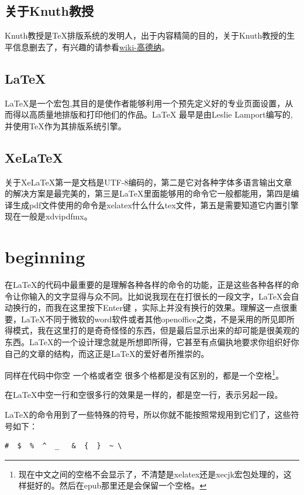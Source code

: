 \documentclass[11pt,oneside]{book}
\begin{document}
\section{关于Knuth教授}
Knuth教授是\TeX 排版系统的发明人，出于内容精简的目的，关于Knuth教授的生平信息删去了，有兴趣的请参看\href{http://zh.wikipedia.org/wiki/%E9%AB%98%E5%BE%B7%E7%BA%B3}{wiki-高德纳}。

\section{LaTeX}
LaTeX是一个宏包,其目的是使作者能够利用一个预先定义好的专业页面设置，从而得以高质量地排版和打印他们的作品。LaTeX 最早是由Leslie Lamport编写的,并使用\TeX 作为其排版系统引擎\cite{lshort}。

\section{XeLaTeX}
关于XeLaTeX第一是文档是UTF-8编码的，第二是它对各种字体多语言输出文章的解决方案是最完美的，第三是LaTeX里面能够用的命令它一般都能用，第四是编译生成pdf文件使用的命令是xelatex什么什么tex文件，第五是需要知道它内置引擎现在一般是xdvipdfmx。


\chapter{beginning}
在\LaTeX 的代码中最重要的是理解各种各样的命令的功能，正是这些各种各样的命令让你输入的文字显得与众不同。比如说我现在在打很长的一段文字，\LaTeX 会自动换行的，而我在这里按下Enter键
，实际上并没有换行的效果。理解这一点很重要，\LaTeX 不同于微软的word软件或者其他openoffice之类，不是采用的所见即所得模式，我在这里打的是奇奇怪怪的东西，但是最后显示出来的却可能是很美观的东西。\LaTeX 的一个设计理念就是所想即所得，它甚至有点偏执地要求你组织好你自己的文章的结构，而这正是\LaTeX 的爱好者所推崇的。

同样在代码中你空 一个格或者空      很多个格都是没有区别的，都是一个空格\footnote{现在中文之间的空格不会显示了，不清楚是xelatex还是xecjk宏包处理的，这样挺好的。然后在epub那里还是会保留一个空格。}。



在\LaTeX 中空一行和空很多行的效果是一样的，都是空一行，表示另起一段。

\LaTeX 的命令用到了一些特殊的符号，所以你就不能按照常规用到它们了，这些符号如下：
\begin{Verbatim}
#  $  %  ^  _   &  {  }  ~ \
\end{Verbatim}
\end{document}
